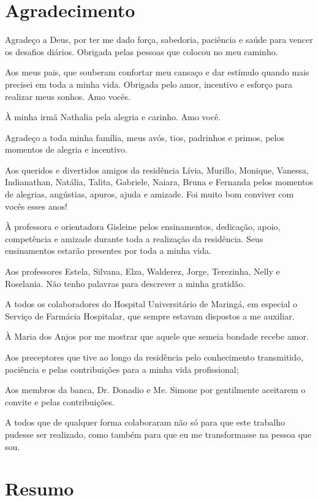\documentclass[svgnames,12pt,oneside, openright,a4paper]{scrbook}
\begin{document}

\tableofcontents*
\chapter*{Agradecimento}

Agradeço a Deus, por ter me dado força, sabedoria, paciência e saúde para vencer os desafios diários. Obrigada pelas pessoas que colocou no meu caminho. 

Aos meus pais, que souberam confortar meu cansaço e dar estímulo quando mais precisei em toda a minha vida. Obrigada pelo amor, incentivo e esforço para realizar meus sonhos. Amo vocês. 

À minha irmã Nathalia pela alegria e carinho. Amo você. 

Agradeço a toda minha família, meus avós, tios, padrinhos e primos, pelos momentos de alegria e incentivo. 

Aos queridos e divertidos amigos da residência Lívia, Murillo, Monique, Vanessa, Indianathan, Natália, Talita, Gabriele, Naiara, Bruna e Fernanda pelos momentos de alegrias, angústias, apuros, ajuda e amizade. Foi muito bom conviver com vocês esses anos!

À professora e orientadora Gisleine pelos ensinamentos, dedicação, apoio, competência e amizade durante toda a realização da residência. Seus ensinamentos estarão presentes por toda a minha vida. 

Aos professores Estela, Silvana, Elza, Walderez, Jorge, Terezinha, Nelly e Roselania. Não tenho palavras para descrever a minha gratidão. 

A todos os colaboradores do Hospital Universitário de Maringá, em especial o Serviço de Farmácia Hospitalar, que sempre estavam dispostos a me auxiliar. 

À Maria dos Anjos por me mostrar que aquele que semeia bondade recebe amor. 

Aos preceptores que tive ao longo da residência pelo conhecimento transmitido, paciência e pelas contribuições para a minha vida profissional; 

Aos membros da banca, Dr. Donadio e Me. Simone por gentilmente aceitarem o convite e pelas contribuições. 

A todos que de qualquer forma colaboraram não só para que este trabalho pudesse ser realizado, como também para que eu me transformasse na pessoa que sou.


\chapter*{Resumo}
\end{document}
